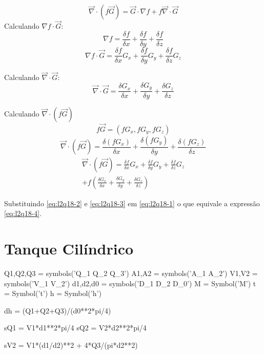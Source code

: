 \documentclass[a4paper,twocolumn,11pt]{article}
\begin{document}
\section{} %
\begin{equation}\label{eq:l2q18-1}
\vec{\nabla} \cdot (f \vec{G}) =  \vec{G} \cdot \nabla f +  f \vec{\nabla} \cdot \vec{G}
\end{equation}
Calculando $\nabla f \cdot \vec{G}$:
$$
\nabla f =  \frac{\delta f}{\delta x} + \frac{\delta f}{\delta y} + \frac{\delta f}{\delta z}
$$
\begin{equation}\label{eq:l2q18-2}
\nabla f \cdot \vec{G} =  \frac{\delta f}{\delta x}G_x + \frac{\delta f}{\delta y}G_y + \frac{\delta f}{\delta z}G_z
\end{equation}

Calculando $\vec{\nabla} \cdot \vec{G}$:
\begin{equation}\label{eq:l2q18-3}
\vec{\nabla} \cdot \vec{G}=\frac{\delta G_x}{\delta x} + \frac{\delta G_y}{\delta y} + \frac{\delta G_z}{\delta z}
\end{equation}

Calculando $\vec{\nabla} \cdot (f \vec{G})$
$$
f\vec{G} = (f G_x,f G_y,f G_z)
$$
$$
\vec{\nabla} \cdot (f \vec{G}) = \frac{\delta (f G_x)}{\delta x} + \frac{\delta (f G_y)}{\delta y} + \frac{\delta (f G_z)}{\delta z}
$$
\begin{multline}\label{eq:l2q18-4}
\vec{\nabla} \cdot (f \vec{G}) =  \frac{\delta f}{\delta x}G_x + \frac{\delta f}{\delta y}G_y + \frac{\delta f}{\delta z}G_z\\ + f\left( \frac{\delta G_x}{\delta x} + \frac{\delta G_y}{\delta y} + \frac{\delta G_z}{\delta z} \right)
\end{multline}

Substituindo \eqref{eq:l2q18-2} e \eqref{eq:l2q18-3} em \eqref{eq:l2q18-1} o que equivale a expressão \eqref{eq:l2q18-4}.

\section{Tanque Cilíndrico} %
\begin{sympycode}
Q1,Q2,Q3 = symbols('Q_1 Q_2 Q_3')
A1,A2 = symbols('A_1 A_2')
V1,V2 = symbols('V_1 V_2')
d1,d2,d0 = symbols('D_1 D_2 D_0')
M = Symbol('M')
t = Symbol('t')
h = Symbol('h')

dh = (Q1+Q2+Q3)/(d0**2*pi/4)

sQ1 = V1*d1**2*pi/4
sQ2 = V2*d2**2*pi/4

sV2 = V1*(d1/d2)**2 + 4*Q3/(pi*d2**2)
\end{sympycode}
\end{document}
